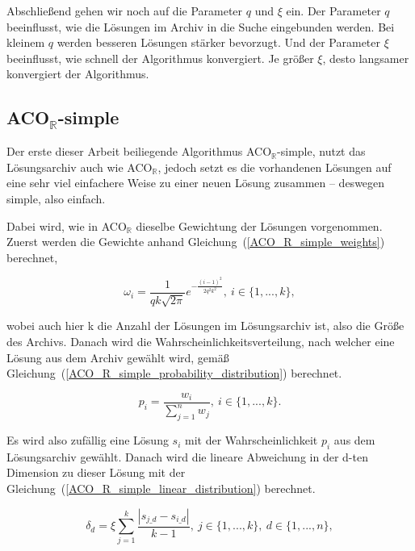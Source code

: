 \documentclass[fontsize=12, a4aper]{scrartcl}
\begin{document}
	\noindent Abschließend gehen wir noch auf die Parameter \(q\) und \(\xi\) ein. Der Parameter \(q\) beeinflusst, wie die Lösungen im Archiv in die Suche eingebunden werden. Bei kleinem \(q\) werden besseren Lösungen stärker bevorzugt. Und der Parameter \(\xi\) beeinflusst, wie schnell der Algorithmus konvergiert. Je größer \(\xi\), desto langsamer konvergiert der Algorithmus.
	
	\subsection{ACO\(_{\mathbb{R}}\)-simple} \label{ACO_R_simple}
	
	Der erste dieser Arbeit beiliegende Algorithmus ACO\(_{\mathbb{R}}\)-simple, nutzt das Lösungsarchiv auch wie ACO\(_{\mathbb{R}}\), jedoch setzt es die vorhandenen Lösungen auf eine sehr viel einfachere Weise zu einer neuen Lösung zusammen -- deswegen simple, also einfach.\hfill\newline
	
	\noindent Dabei wird, wie in ACO\(_{\mathbb{R}}\) dieselbe Gewichtung der Lösungen vorgenommen. Zuerst werden die Gewichte anhand Gleichung~(\ref{ACO_R_simple_weights}) berechnet,
	
	\begin{equation} \label{ACO_R_simple_weights}
	\omega_i = \frac{1}{qk\sqrt{2\pi}}e^{-\frac{(i-1)^2}{2q^2k^2}}, ~ 
	i \in \{1, ..., k\},
	\end{equation}
	
	\noindent wobei auch hier k die Anzahl der Lösungen im Lösungsarchiv ist, also die Größe des Archivs. Danach wird die Wahrscheinlichkeitsverteilung, nach welcher eine Lösung aus dem Archiv gewählt wird, gemäß Gleichung~(\ref{ACO_R_simple_probability_distribution}) berechnet.
		
	\begin{equation} \label{ACO_R_simple_probability_distribution}
	p_i=\frac{w_i}{\sum_{j=1}^{n} w_j}, ~  i \in \{1, ..., k\}.
	\end{equation}
	
	\noindent Es wird also zufällig eine Lösung \(s_i\) mit der Wahrscheinlichkeit \(p_i\) aus dem Lösungsarchiv gewählt. Danach wird die lineare Abweichung in der d-ten Dimension zu dieser Lösung mit der Gleichung~(\ref{ACO_R_simple_linear_distribution}) berechnet.
	
	\begin{equation} \label{ACO_R_simple_linear_distribution}
	\delta_d = \xi\sum_{j=1}^{k} \frac{|s_{j\_d}-s_{i\_d}|}{k-1}, ~ j \in \{1, ..., k\}, ~ d \in \{1, ..., n\},
	\end{equation}
	
\end{document}
